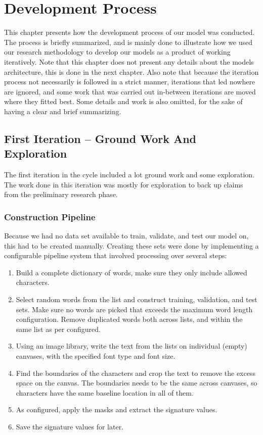 
\chapter{Development Process}
\label{ch:development_process}
This chapter presents how the development process of our model was conducted. The process is briefly summarized, and is mainly done to illustrate how we used our research methodology to develop our models as a product of working iteratively. Note that this chapter does not present any details about the models architecture, this is done in the next chapter. Also note that because the iteration process not necessarily is followed in a strict manner, iterations that led nowhere are ignored, and some work that was carried out in-between iterations are moved where they fitted best. Some details and work is also omitted, for the sake of having a clear and brief summarizing.


\section{First Iteration -- Ground Work And Exploration}
The first iteration in the cycle included a lot ground work and some exploration. The work done in this iteration was mostly for exploration to back up claims from the preliminary research phase.

\subsection{Construction Pipeline}
\label{sec:construction_pipeline}
Because we had no data set available to train, validate, and test our model on, this had to be created manually. Creating these sets were done by implementing a configurable pipeline system that involved processing over several steps:

\begin{enumerate}
    \item Build a complete dictionary of words, make sure they only include allowed characters.
    \item Select random words from the list and construct training, validation, and test sets. Make sure no words are picked that exceeds the maximum word length configuration. Remove duplicated words both across lists, and within the same list as per configured.
    \item Using an image library, write the text from the lists on individual (empty) canvases, with the specified font type and font size.
    \item Find the boundaries of the characters and crop the text to remove the excess space on the canvas. The boundaries needs to be the same across canvases, so characters have the same baseline location in all of them.
    \item As configured, apply the masks and extract the signature values.
    \item Save the signature values for later.
\end{enumerate}

